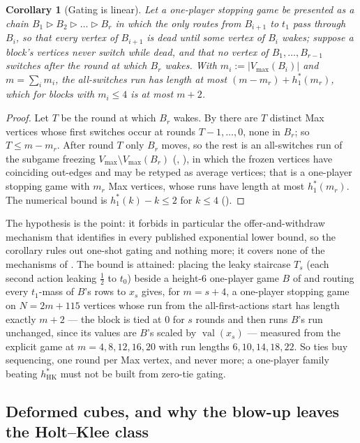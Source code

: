 \documentclass[11pt]{article}
\theoremstyle{plain}
\newtheorem{corollary}[theorem]{Corollary}
\theoremstyle{definition}
\DeclareMathOperator{\val}{val}
\newcommand{\Vmax}{V_{\max}}
\begin{document}
\begin{corollary}[Gating is linear]\label{cor:gate}
Let a one-player stopping game be presented as a chain
$B_1\rhd B_2\rhd\dots\rhd B_r$ in which the only routes from $B_{i+1}$ to
$t_1$ pass through $B_i$, so that every vertex of $B_{i+1}$ is dead until
some vertex of $B_i$ wakes; suppose a block's vertices never switch while
dead, and that no vertex of $B_1,\dots,B_{r-1}$ switches after the round
at which $B_r$ wakes. With $m_i:=|\Vmax(B_i)|$ and $m=\sum_im_i$, the
all-switches run has length at most $(m-m_r)+h^{\ast}_{1}(m_r)$, which
for blocks with $m_i\le4$ is at most $m+2$.
\end{corollary}

\begin{proof}
Let $T$ be the round at which $B_r$ wakes. By 
there are $T$ distinct Max vertices whose first switches occur at rounds
$T-1,\dots,0$, none in $B_r$; so $T\le m-m_r$. After round $T$ only
$B_r$ moves, so the rest is an all-switches run of the subgame freezing
$\Vmax\setminus\Vmax(B_r)$ (, ), in
which the frozen vertices have coinciding out-edges and may be retyped as
average vertices; that is a one-player stopping game with $m_r$ Max
vertices, whose runs have length at most $h^{\ast}_{1}(m_r)$. The
numerical bound is $h^{\ast}_{1}(k)-k\le2$ for $k\le4$
().
\end{proof}

The hypothesis is the point: it forbids in particular the offer-and-withdraw
mechanism that  identifies in every
published exponential lower bound, so the corollary rules out one-shot
gating and nothing more; it covers none of the mechanisms of
. The bound is attained: placing the leaky staircase $T_s$
(each second action leaking $\tfrac12$ to $t_0$) beside a height-$6$
one-player game $B$ of  and routing every
$t_1$-mass of $B$'s rows to $x_s$ gives, for $m=s+4$, a one-player
stopping game on $N=2m+115$ vertices whose run from the all-first-actions
start has length exactly $m+2$ --- the block is tied at $0$ for $s$
rounds and then runs $B$'s run unchanged, since its values are
$B$'s scaled by $\val(x_s)$ --- measured from the explicit game at
$m=4,8,12,16,20$ with run lengths $6,10,14,18,22$. So ties buy
sequencing, one round per Max vertex, and never more; a one-player
family beating $h^{\ast}_{\mathrm{HK}}$ must not be built from zero-tie
gating.

\subsection{Deformed cubes, and why the blow-up leaves the Holt--Klee class}\label{sec:deformed}
\end{document}
